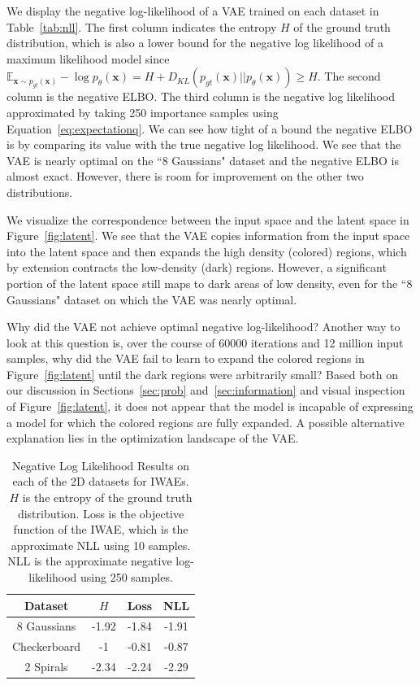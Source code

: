 \documentclass{article}
\begin{document}
We display the negative log-likelihood of a VAE trained on each dataset in Table~\ref{tab:nll}. The first column indicates the entropy $H$ of the ground truth distribution, which is also a lower bound for the negative log likelihood of a maximum likelihood model since $\mathbb{E}_{\mathbf{x} \sim p_{gt}(\mathbf{x})} -\log p_\theta(\mathbf{x}) = H + D_{KL}(p_{gt}(\mathbf{x}) || p_\theta(\mathbf{x})) \geq H$. 
The second column is the negative ELBO. The third column is the negative log likelihood approximated by taking 250 importance samples using Equation~\ref{eq:expectationq}. 
We can see how tight of a bound the negative ELBO is by comparing its value with the true negative log likelihood. We see that the VAE is nearly optimal on the ``8 Gaussians" dataset and the negative ELBO is almost exact. However, there is room for improvement on the other two distributions.

We visualize the correspondence between the input space and the latent space in Figure~\ref{fig:latent}. We see that the VAE copies information from the input space into the latent space and then expands the high density (colored) regions, which by extension contracts the low-density (dark) regions.
However, a significant portion of the latent space still maps to dark areas of low density, even for the ``8 Gaussians" dataset on which the VAE was nearly optimal.

Why did the VAE not achieve optimal negative log-likelihood?
Another way to look at this question is, over the course of 60000 iterations and 12 million input samples, why did the VAE fail to learn to expand the colored regions in Figure~\ref{fig:latent} until the dark regions were arbitrarily small?
Based both on our discussion in Sections~\ref{sec:prob} and~\ref{sec:information} and visual inspection of Figure~\ref{fig:latent}, it does not appear that the model is incapable of expressing a model for which the colored regions are fully expanded. A possible alternative explanation lies in the optimization landscape of the VAE.


\begin{table}
    \centering
    \begin{tabular}{|c|c|c|c|}
    \hline
        Dataset&$H$&Loss&NLL\\
        \hline
         8 Gaussians&  -1.92&-1.84&-1.91\\
         Checkerboard& -1&-0.81&-0.87\\
         2 Spirals& -2.34&-2.24&-2.29\\
         \hline
    \end{tabular}
    \caption{Negative Log Likelihood Results on each of the 2D datasets for IWAEs. $H$ is the entropy of the ground truth distribution. Loss is the objective function of the IWAE, which is the approximate NLL using 10 samples. NLL is the approximate negative log-likelihood using 250 samples.}
    \label{tab:nll_iwae}
\end{table}
\end{document}
